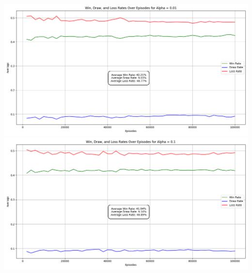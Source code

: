 \documentclass{article}
\begin{document}
\begin{center}
    \includegraphics[scale=0.4]{Win_Draw_Loss_Rates_Alpha_0.01.png}
    \includegraphics[scale=0.4]{Win_Draw_Loss_Rates_Alpha_0.1.png}
\end{center}\par 

\end{document}
